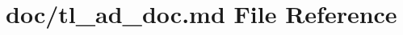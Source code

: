 \hypertarget{tl__ad__doc_8md}{}\section{doc/tl\+\_\+ad\+\_\+doc.md File Reference}
\label{tl__ad__doc_8md}
